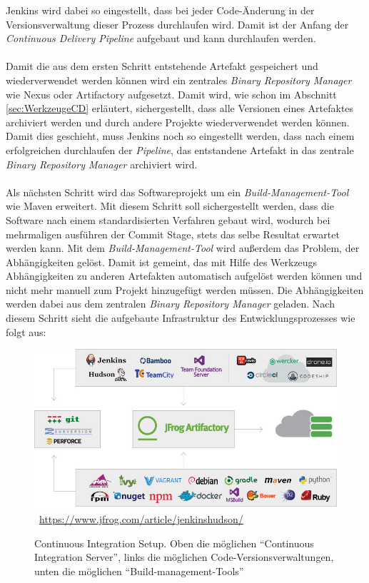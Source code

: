 Jenkins wird dabei so eingestellt, dass bei jeder Code-Änderung in der Versionsverwaltung dieser Prozess durchlaufen wird. Damit ist der Anfang der \textit{Continuous Delivery Pipeline} aufgebaut und kann durchlaufen werden.
\\\\
Damit die aus dem ersten Schritt entstehende Artefakt gespeichert und wiederverwendet werden können wird ein zentrales \textit{Binary Repository Manager} wie Nexus oder Artifactory aufgesetzt. Damit wird, wie schon im Abschnitt \ref{sec:WerkzeugeCD}  erläutert, sichergestellt, dass alle Versionen eines Artefaktes archiviert werden und durch andere Projekte wiederverwendet werden können. Damit dies geschieht, muss Jenkins noch so eingestellt werden, dass nach einem erfolgreichen durchlaufen der \textit{Pipeline}, das entstandene Artefakt in das zentrale \textit{Binary Repository Manager} archiviert wird.
\\\\
Als nächsten Schritt wird das Softwareprojekt um ein \textit{Build-Management-Tool} wie Maven erweitert. Mit diesem Schritt soll sichergestellt werden, dass die Software nach einem standardisierten Verfahren gebaut wird, wodurch bei mehrmaligen ausführen der Commit Stage, stets das selbe Resultat erwartet werden kann.  Mit dem \textit{Build-Management-Tool} wird außerdem das Problem, der Abhängigkeiten gelöst. Damit ist gemeint, das mit Hilfe des Werkzeugs Abhängigkeiten zu anderen Artefakten automatisch aufgelöst werden können und nicht mehr manuell zum Projekt hinzugefügt werden müssen. Die Abhängigkeiten werden dabei aus dem zentralen \textit{Binary Repository Manager} geladen.
\newpage
Nach diesem Schritt sieht die aufgebaute Infrastruktur des Entwicklungsprozesses wie folgt aus:

\begin{figure}[htb]
    \centering 
    \includegraphics[width=\linewidth]{content/images/CISetup}\
    \quelle\url{https://www.jfrog.com/article/jenkinshudson/}
    \caption[Continuous Integration Setup]{Continuous Integration Setup. Oben die möglichen "`Continuous Integration Server"', links die möglichen Code-Versionsverwaltungen, unten die möglichen "`Build-management-Tools"'}
    \label{fig:CISetup}  
\end{figure}

